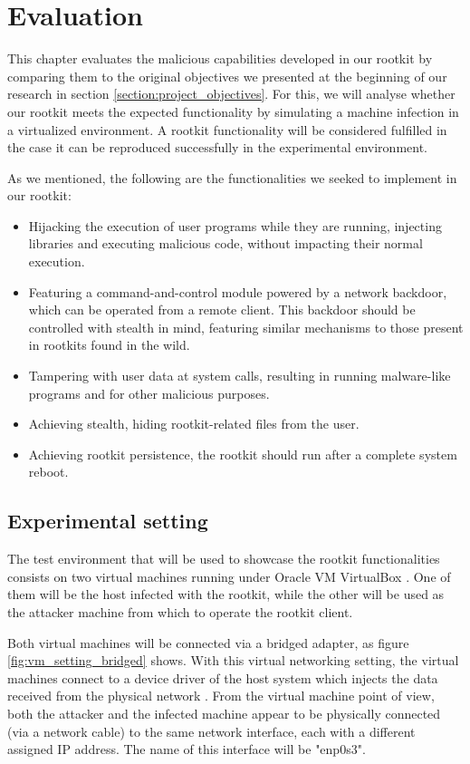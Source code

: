 \chapter{Evaluation} \label{chapter:evaluation}
This chapter evaluates the malicious capabilities developed in our rootkit by comparing them to the original objectives we presented at the beginning of our research in section \ref{section:project_objectives}. For this, we will analyse whether our rootkit meets the expected functionality by simulating a machine infection in a virtualized environment. A rootkit functionality will be considered fulfilled in the case it can be reproduced successfully in the experimental environment.

As we mentioned, the following are the functionalities we seeked to implement in our rootkit:
\begin{itemize}
\item Hijacking the execution of user programs while they are running, injecting libraries and executing malicious code, without impacting their normal execution.
\item Featuring a command-and-control module powered by a network backdoor, which can be operated from a remote client. This backdoor should be controlled with stealth in mind, featuring similar mechanisms to those present in rootkits found in the wild.
\item Tampering with user data at system calls, resulting in running malware-like programs and for other malicious purposes.
\item Achieving stealth, hiding rootkit-related files from the user.
\item Achieving rootkit persistence, the rootkit should run after a complete system reboot.
\end{itemize}

\section{Experimental setting}
The test environment that will be used to showcase the rootkit functionalities consists on two virtual machines running under Oracle VM VirtualBox \cite{virtualbox_page}. One of them will be the host infected with the rootkit, while the other will be used as the attacker machine from which to operate the rootkit client. 

Both virtual machines will be connected via a bridged adapter, as figure \ref{fig:vm_setting_bridged} shows. With this virtual networking setting, the virtual machines connect to a device driver of the host system which injects the data received from the physical network \cite{bridged_networking}. From the virtual machine point of view, both the attacker and the infected machine appear to be physically connected (via a network cable) to the same network interface, each with a different assigned IP address. The name of this interface will be "enp0s3".

